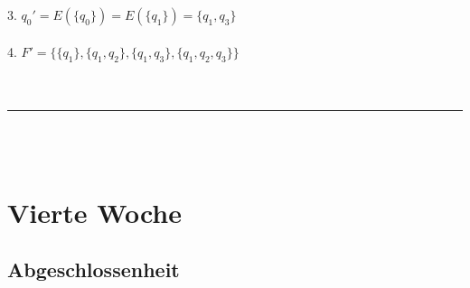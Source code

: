 \documentclass[18pt,a4paper]{scrreprt}
\begin{document}
\\
\\
\\
3. $q_0' = E(\{q_0\}) = E(\{q_1\}) = \{q_1,q_3\}$\\
\\
4. $F' = \{\{q_1\}, \{q_1,q_2\}, \{q_1, q_3\}, \{q_1, q_2, q_3\}\}$\\
\\
\\
\rule{\textwidth}{0.4mm}\\
\\

\chapter{Vierte Woche}


\section{Abgeschlossenheit}
\end{document}
